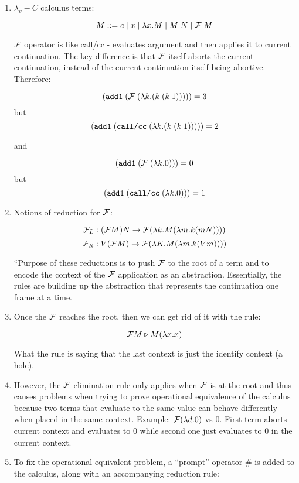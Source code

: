 \documentclass[letterpaper]{llncs}
\begin{document}
\begin{enumerate}

	\item $\lambda_v\!\!-\!\!C$ calculus terms:
	
$$M ::= c \mid x \mid  \lambda x.M  \mid  M \; N  \mid   \mathcal{F}  \; M $$

$ \mathcal{F} $ operator is like call/cc - evaluates argument and then applies it to current continuation. The key difference is that $ \mathcal{F} $ itself aborts the current continuation, instead of the current continuation itself being abortive. Therefore: 

$$ (  \texttt{add1}  \;   (   \mathcal{F}   \;   ( \lambda k.  (  k  \;   ( k \; 1 )   )   )  )  )  = 3$$
 but 
$$ (  \texttt{add1}  \;   (  \texttt{call/cc}  \;   ( \lambda k.  (  k  \;   ( k \; 1 )   )   )  )  )  = 2$$
	
and 

$$ (  \texttt{add1}  \;   (   \mathcal{F}   \;   ( \lambda k. 0  )  )  )  = 0$$
 but 
$$ (  \texttt{add1}  \;   (  \texttt{call/cc}  \;   ( \lambda k. 0  )  )  )  = 1$$

	\item Notions of reduction for $ \mathcal{F} $:
	
	$$ \mathcal{F} _L: ( \mathcal{F}  M) N \rightarrow  \mathcal{F}  (\lambda k.M (\lambda m.k (m N))))$$
	$$ \mathcal{F} _R: V ( \mathcal{F}  M) \rightarrow  \mathcal{F}  (\lambda K.M (\lambda m.k (V m))))$$

``Purpose of these reductions is to push $ \mathcal{F} $ to the root of a term and to encode the context of the $ \mathcal{F} $ application as an abstraction. Essentially, the rules are building up the abstraction that represents the continuation one frame at a time.

	\item

Once the $ \mathcal{F} $ reaches the root, then we can get rid of it with the rule:

$$ \mathcal{F}  M \triangleright M (\lambda x.x)$$

What the rule is saying that the last context is just the identify context (a hole).

	\item However, the $ \mathcal{F} $ elimination rule only applies when $ \mathcal{F} $ is at the root and thus causes problems when trying to prove operational equivalence of the calculus because two terms that evaluate to the same value can behave differently when placed in the same context. Example: $ \mathcal{F}  (\lambda d.0)$ vs 0. First term aborts current context and evaluates to 0 while second one just evaluates to 0 in the current context.
	
	\item To fix the operational equivalent problem, a ``prompt'' operator \# is added to the calculus, along with an accompanying reduction rule:
	

\end{enumerate}
\end{document}
